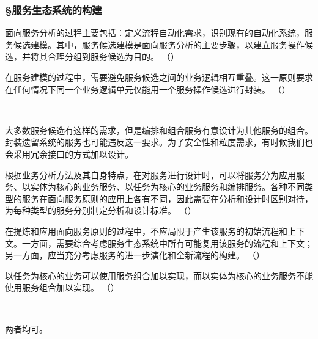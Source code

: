 \subsubsection*{\S 服务生态系统的构建}
\setcounter{problemname}{0}

\begin{problem}
	面向服务分析的过程主要包括：定义流程自动化需求，识别现有的自动化系统，服务候选建模。其中，服务候选建模是面向服务分析的主要步骤，以建立服务操作候选，并将其合理分组到服务候选为目的。
	\hfill （）
\end{problem}


\begin{problem}
	在服务建模的过程中，需要避免服务候选之间的业务逻辑相互重叠。这一原则要求在任何情况下同一个业务逻辑单元仅能用一个服务操作候选进行封装。
	\hfill （）
\end{problem}
\\ \begin{solution}
	大多数服务候选有这样的需求，但是编排和组合服务有意设计为其他服务的组合。封装遗留系统的服务也可能违反这一要求。为了安全性和粒度需求，有时候我们也会采用冗余接口的方式加以设计。
\end{solution}


\begin{problem}
	​根据业务分析方法及其自身特点，在对服务进行设计时，可以将服务分为应用服务、以实体为核心的业务服务、以任务为核心的业务服务和编排服务。各种不同类型的服务在面向服务原则的应用上各有不同，因此需要在分析和设计时区别对待，为每种类型的服务分别制定分析和设计标准。
	\hfill （）
\end{problem}


\begin{problem}
	在提炼和应用面向服务原则的过程中，不应局限于产生该服务的初始流程和上下文。一方面，需要综合考虑服务生态系统中所有可能复用该服务的流程和上下文；另一方面，应当充分考虑服务的进一步演化和全新流程的构建。
	\hfill （）
\end{problem}


\begin{problem}
	以任务为核心的业务可以使用服务组合加以实现，而以实体为核心的业务服务不能使用服务组合加以实现。
	\hfill （）
\end{problem}
\\ \begin{solution}
	两者均可。
\end{solution}


